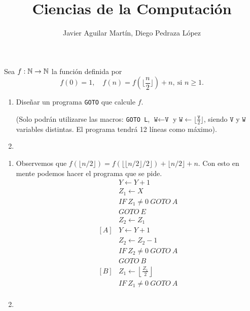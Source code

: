 \documentclass[twoside]{article}
\begin{document}
\title{Ciencias de la Computación}

\author{Javier Aguilar Martín, Diego Pedraza López}
\maketitle

\begin{ejercicio}{1}
Sea $f : \mathbb{N} \to \mathbb{N}$ la función definida por
$$f(0) = 1,\quad f(n) = f(\lfloor\frac{n}{2}\rfloor) + n,\ \text{si }n \geq 1.$$
\begin{enumerate}
\item Diseñar un programa \texttt{GOTO} que calcule $f$.

(Solo podrán utilizarse las macros: \texttt{GOTO L}, $\texttt{W}\leftarrow \texttt{V}$ y $\texttt{W}\leftarrow   \lfloor\frac{\texttt{V}}{2}\rfloor$, siendo $\texttt{V}$ y $\texttt{W}$ variables
distintas. El programa tendrá 12 líneas como máximo).
\item 
\end{enumerate}
\end{ejercicio}
\begin{solucion}
\begin{enumerate}
\item Observemos que $f(\lfloor n/2\rfloor)=f(\lfloor\lfloor n/2\rfloor/2\rfloor)+\lfloor n/2\rfloor+n$. Con esto en mente podemos hacer el programa que se pide.
\begin{align*}
& Y\leftarrow Y+1\\
&Z_1\leftarrow X\\
& IF\ Z_1\neq 0\ GOTO\ A\\
& GOTO\ E\\
&Z_2\leftarrow Z_1\\
[A]& Y\leftarrow Y+1\\
&Z_2\leftarrow Z_2-1\\
&IF\ Z_2\neq 0\ GOTO\ A\\
&GOTO\ B\\
[B]&Z_1\leftarrow \left\lfloor\frac{Z_1}{2}\right\rfloor\\
& IF\ Z_1\neq 0\ GOTO\ A\\
\end{align*}


\item
\end{enumerate}
\end{solucion}

\newpage
\end{document}
